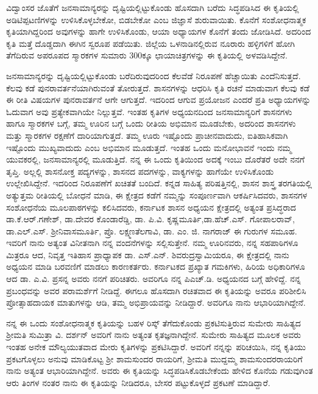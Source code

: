 ವಿದ್ವಾಂಸರ ಜೊತೆಗೆ ಜನಸಾಮಾನ್ಯರನ್ನು ದೃಷ್ಟಿಯಲ್ಲಿಟ್ಟುಕೊಂಡು ಹೊಸದಾಗಿ ಬರೆದು ಸಿದ್ಧಪಡಿಸಿದ ಈ ಕೃತಿಯಲ್ಲಿ ಅಡಿಟಿಪ್ಪಟಣಿಗಳನ್ನು ಉಳಿಸಿಕೊಳ್ಳಬೇಕೋ, ಬಿಡಬೇಕೋ ಎಂಬ ಜಿಜ್ಞಾಸೆ ಶುರುವಾಯಿತು. ಕೊನೆಗೆ ಸಂಶೋಧನಾತ್ಮಕ ಕೃತಿ\-ಯಾಗಿದ್ದರಿಂದ ಅವುಗಳನ್ನು ಹಾಗೇ ಉಳಿಸಿಕೊಂಡು, ಆಯಾ ಅಧ್ಯಾಯಗಳ ಕೊನೆಗೆ ತಂದು ಜೋಡಿಸಿದೆ. ಅದರಿಂದ ಕೃತಿ ಮತ್ತೆ ದೊಡ್ಡದಾಗಿ ಈಗಿನ ಸ್ವರೂಪ ಪಡೆಯಿತು. ಜಿಲ್ಲೆಯ ಒಳನಾಡಿನಲ್ಲಿರುವ ನೂರಾರು ಹಳ್ಳಿಗಳಿಗೆ ಹೋಗಿ ತೆಗೆದಿರುವ ಅಪರೂಪದ ಸ್ಮಾರಕಗಳ ಸುಮಾರು 300ಕ್ಕೂ ಛಾಯಾಚಿತ್ರಗಳನ್ನು ಈ ಕೃತಿಯಲ್ಲಿ ಅಳವಡಿಸಿದ್ದೇನೆ.

ಜನಸಾಮಾನ್ಯರನ್ನು ದೃಷ್ಟಿಯಲ್ಲಿಟ್ಟುಕೊಂಡು ಬರೆದಿರುವುದರಿಂದ ಕೆಲವೆಡೆ ನಿರೂಪಣೆ ಹೆಚ್ಚಾಯಿತು ಎಂದೆನಿಸು\-ತ್ತದೆ. ಕೆಲವು ಕಡೆ ಪುನರಾವರ್ತನೆಯಾಗಿರುವಂತೆ ತೋರುತ್ತದೆ.   ಶಾಸನಗಳನ್ನು ಆಧರಿಸಿ ಕೃತಿ ರಚನೆ ಮಾಡುವಾಗ ಕೆಲವು ಕಡೆ ಈ ರೀತಿ ವಿಷಯಗಳ ಪುನರಾವರ್ತನೆ ಆಗೇ ಆಗುತ್ತದೆ. ಇದರಿಂದ ಆಗುವ ಪ್ರಯೋಜನ ಎಂದರೆ ಪ್ರತಿ ಅಧ್ಯಾಯಗಳನ್ನು ಓದುವಾಗ  ಅವು ಪ್ರತ್ಯೇಕವಾಗಿಯೇ ನಿಲ್ಲುತ್ತವೆ. ಇಂತಹ ಕೃತಿಗಳ ಅಧ್ಯಯನದಿಂದ ಜನಸಾಮಾನ್ಯರಿಗೆ ಶಾಸನಗಳು ಹಾಗೂ ಸ್ಮಾರಕಗಳ ಬಗ್ಗೆ, ತಮ್ಮ ಊರಿನ ಬಗ್ಗೆ ಒಂದು ರೀತಿಯ ಅಭಿಮಾನ ಮೂಡಬೇಕು, ಅದರಿಂದ ಶಾಸನಗಳು ಮತ್ತು ಸ್ಮಾರಕಗಳ ರಕ್ಷಣೆಗೆ ದಾರಿಯಾಗುತ್ತದೆ. ತಮ್ಮ ಊರು ಇಷ್ಟೊಂದು ಪ್ರಾಚೀನವಾದುದು, ಐತಿಹಾಸಿಕವಾಗಿ ಇಷ್ಟೊಂದು ಮುಖ್ಯವಾದುದು ಎಂಬ ಅಭಿಮಾನ ಮೂಡುತ್ತದೆ.  ಇಂತಹ ಒಂದು ಮನೋಭಾವನೆ ಇಂದು ನಮ್ಮ ಯುವಕರಲ್ಲಿ, ಜನಸಾಮಾನ್ಯರಲ್ಲಿ ಮೂಡು\-ತ್ತಿದೆ. ನನ್ನ ಈ ಒಂದು ಕೃತಿಯಿಂದ ಅದಕ್ಕೆ ಇಂಬು ದೊರೆತರೆ ಅದೇ ನನಗೆ ತೃಪ್ತಿ. ಅಲ್ಲಲ್ಲಿ ಶಾಸನೋಕ್ತ ಪದ್ಯಗಳನ್ನು, ಶಾಸನದ ಪದಗಳನ್ನು, ವಾಕ್ಯಗಳನ್ನು ಹಾಗೆಯೇ ಉಳಿಸಿಕೊಂಡು ಉಲ್ಲೇಖಿಸಿದ್ದೇನೆ. ಇದರಿಂದ ನಿರೂಪಣೆಗೆ ಖಚಿತತೆ ಬಂದಿದೆ.  ಕನ್ನಡ ಸಾಹಿತ್ಯ ಪರಿಷತ್ತಿನಲ್ಲಿ,  ಶಾಸನ ಶಾಸ್ತ್ರ ತರಗತಿಯಲ್ಲಿ ಅತ್ಯುತ್ತಮ ರೀತಿಯಲ್ಲಿ ಬೋಧನೆ ಮಾಡಿ, ಈ ಕ್ಷೇತ್ರದ ಕಡೆಗೆ \hbox{ನಮ್ಮನ್ನು} ಸಂಪೂರ್ಣವಾಗಿ ಆಕರ್ಷಿಸಿದವರು, ಶಾಸನಗಳ ಸಂಶೋಧನೆಯ ಮೂಲಪಾಠಗಳನ್ನು ಕಲಿಸಿದವರು, ಕರ್ನಾಟಕ ಶಾಸನ ಅಧ್ಯಯನ ಕ್ಷೇತ್ರದಲ್ಲಿ ಅತ್ಯಂತ ಪ್ರಸಿದ್ಧರಾದ  ಡಾ.ಕೆ.ಆರ್​.ಗಣೇಶ್​, ಡಾ.ದೇವರ ಕೊಂಡಾರೆಡ್ಡಿ, ಡಾ. ಪಿ.ವಿ. ಕೃಷ್ಣಮೂರ್ತಿ,\break ಡಾ.ಹೆಚ್​.ಎಸ್​. ಗೋಪಾಲರಾವ್​, ಡಾ.ಎಲ್​.ಎಸ್​. ಶ್ರೀನಿವಾಸಮೂರ್ತಿ, ಪ್ರೊ. ಲಕ್ಷ್ಮಣತೆಲಗಾವಿ, ಡಾ. ಎಂ. ಜಿ. \hbox{ನಾಗರಾಜ್} ಈ ಗುರುಗಳ ಸಮೂಹ. ಇವರಿಗೆ ನಾನು ಅತ್ಯಂತ ವಿನೀತನಾಗಿ ನನ್ನ ವಂದನೆಗಳನ್ನು ಸಲ್ಲಿಸುತ್ತೇನೆ. ನಮ್ಮ ಊರಿನವರು, ನನ್ನ ಸಹಪಾಠಿಗಳೂ ಮಿತ್ರರೂ ಆದ, ನಿವೃತ್ತ ಇತಿಹಾಸ ಪ್ರಾಧ್ಯಾಪಕ ಡಾ. ಎಸ್​.ಎನ್​. ಶಿವರುದ್ರಸ್ವಾಮಿಯರೂ, ಈ ಕ್ಷೇತ್ರದಲ್ಲಿ ನಾನು ಅಧ್ಯಯನ ಮಾಡಿ ಬರವಣಿಗೆ ಮಾಡಲು ಕಾರಣಕರ್ತರು. ಕರ್ನಾಟಕದ ಪ್ರಖ್ಯಾತ ಗಮಕಿಗಳು, ಹಿರಿಯ ಅಧಿಕಾರಿಗಳೂ ಆದ ಡಾ. ಎ.ವಿ. ಪ್ರಸನ್ನ ಅವರು ನನಗೆ ಪರಿಚಿತರು. ಅವರಿಗೂ ನನ್ನ ಪಿಎಚ್​.ಡಿ. ಅಧ್ಯಯನದ ಬಗ್ಗೆ ಹೇಳಿದ್ದೆ. ನನ್ನ ಪ್ರಬಂಧವನ್ನು ಅವರ ಪರಾಮರ್ಶೆಗೆ ನೀಡಿದ್ದೆ. ಈಗಲೂ ಹೊಸದಾಗಿ ರಚಿತವಾದ ಈ ಕೃತಿಯನ್ನು ಅವರೂ ಪರಿಶೀಲಿಸಿ ಪ್ರೋತ್ಸಾಹದಾಯಕ ಮಾತುಗಳನ್ನು ಆಡಿ, ತಮ್ಮ ಅಭಿಪ್ರಾಯವನ್ನು ನೀಡಿದ್ದಾರೆ. ಅವರಿಗೂ ನಾನು ಆಭಾರಿಯಾಗಿದ್ದೇನೆ.

ನನ್ನ ಈ ಒಂದು ಸಂಶೋಧನಾತ್ಮಕ ಕೃತಿಯನ್ನು ಬಹಳ ರಿಸ್ಕ್​ ತೆಗೆದುಕೊಂಡು ಪ್ರಕಟಿಸುತ್ತಿರುವ ಸುಮೇರು ಸಾಹಿತ್ಯದ ಶ್ರೀಮತಿ ಸುಮಿತ್ರಾ ವಿ. ದರ್ಶನ್​ ಅವರಿಗೆ ನಾನು ಅತ್ಯಂತ ಕೃತಜ್ಞನಾಗಿದ್ದೇನೆ. ಸುಮೇರು ಸಾಹಿತ್ಯದ ಮೂಲಕ ಅವರು ಇಂತಹ ಅನೇಕ ಮೌಲ್ಯಯುತವಾದ ಮೇರು ಕೃತಿಗಳನ್ನು ಪ್ರಕಟಿಸಿದ್ದಾರೆ.  ಅವರಿಗೆ ನನ್ನನ್ನು ಪರಿಚಯಿಸಿ, ನನ್ನ ಕೃತಿಯು ಪ್ರಕಟ\-ಗೊಳ್ಳಲು ಅನುವು ಮಾಡಿಕೊಟ್ಟ ಶ್ರೀ ಶಾಮಸುಂದರ ರಾಯರಿಗೆ, ಶ್ರೀಮತಿ ಮುದ್ದಮ್ಮ ಶಾಮಸುಂದರರಾಯರಿಗೆ ನಾನು ಅತ್ಯಂತ ಆಭಾರಿಯಾಗಿದ್ದೇನೆ. ಅವರು ಈ ಕೃತಿಯನ್ನು ಸಿದ್ಧಪಡಿಸಿಕೊಡಬೇಕೆಂದು ಹೇಳಿದ ಕೊನೆಯ ಗಡುವುಗಿಂತ ಆರು ತಿಂಗಳ ನಂತರ ನಾನು ಈ ಕೃತಿಯನ್ನು ನೀಡಿದರೂ, ಬೇಸರ ಪಟ್ಟುಕೊಳ್ಳದೆ ಪ್ರಕಟಣೆ ಮಾಡಿದ್ದಾರೆ.

